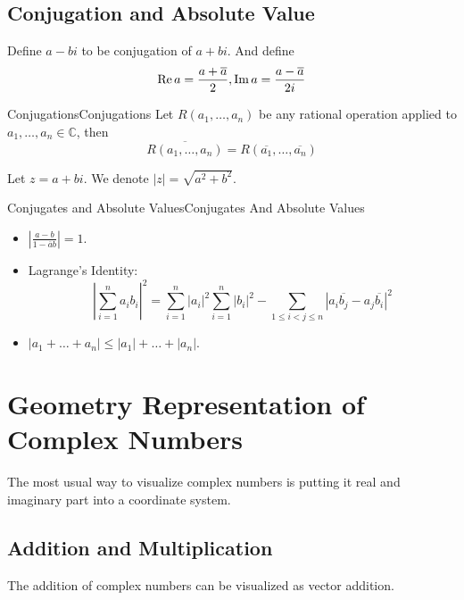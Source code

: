 \documentclass[../main.tex]{subfiles}
\begin{document}
\subsection{Conjugation and Absolute Value}
Define $a-bi$ to be conjugation of $a+bi$. And define
\begin{equation*}
\operatorname{Re} a = \frac{a+\overline{a}}{2}, \operatorname{Im} a = \frac{a-\overline{a}}{2i}
\end{equation*}

\begin{theorem}{Conjugations}{Conjugations}
Let $R(a_1, \ldots ,a_n)$ be any rational operation applied to $a_1, \ldots ,a_n\in \mathbb{C}$, then
\begin{equation}
	\overline{R(a_1, \ldots ,a_n)} = R \left(\overline{a_1}, \ldots ,\overline{a_n}\right)
\end{equation}
\end{theorem}
 
Let $z = a+bi$. We denote $\left|z\right| = \sqrt{a^2+b ^2}$.

\begin{example}{Conjugates and Absolute Values}{Conjugates And Absolute Values}
\begin{itemize}
\item $\displaystyle \left|\frac{a-b}{1-\overline{a}b}\right| = 1$.
\item Lagrange's Identity:
	\begin{equation}
	\left|\sum_{i=1}^{n} a_ib_i\right|^2 = \sum_{i=1}^{n} \left|a_i\right|^2 \sum_{i=1}^{n} \left|b_i\right|^2 - \sum_{1\leq i<j\leq n} \left|a_i \overline{b_j} - a_j \overline{b_i}\right|^2 
	\end{equation}
\item $\left|a_1+\ldots +a_n\right|\leq \left|a_1\right|+\ldots +\left|a_n\right|$.
\end{itemize}
\end{example}


\section{Geometry Representation of Complex Numbers}

The most usual way to visualize complex numbers is putting it real and imaginary part into a coordinate system.

\subsection{Addition and Multiplication}
The addition of complex numbers can be visualized as vector addition.
\end{document}
